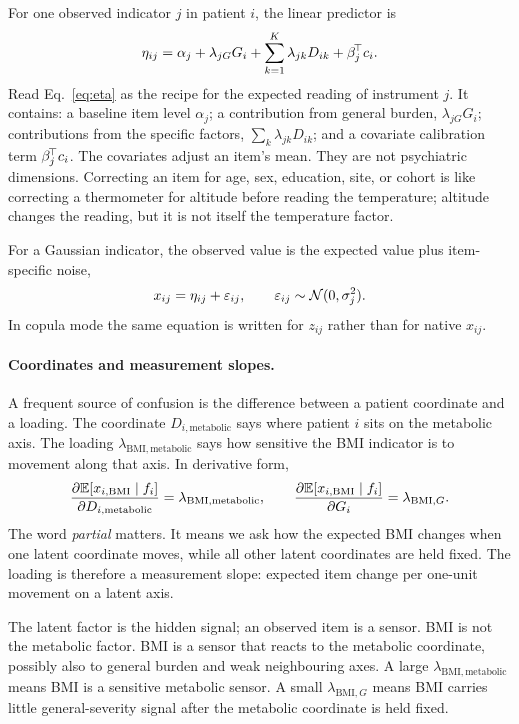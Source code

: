 For one observed indicator $j$ in patient $i$, the linear predictor is
\begin{equation}
\label{eq:eta}
\eta_{ij}=\alpha_j+\lambda_{jG}G_i+\sum_{k=1}^{K}\lambda_{jk}D_{ik}+\beta_j^{\!\top} c_i .
\end{equation}
Read Eq.~\eqref{eq:eta} as the recipe for the expected reading of instrument $j$. It contains: a baseline item
level $\alpha_j$; a contribution from general burden, $\lambda_{jG}G_i$; contributions from the specific factors,
$\sum_k\lambda_{jk}D_{ik}$; and a covariate calibration term $\beta_j^{\!\top} c_i$. The covariates adjust an item's
mean. They are not psychiatric dimensions. Correcting an item for age, sex, education, site, or cohort is like
correcting a thermometer for altitude before reading the temperature; altitude changes the reading, but it is not
itself the temperature factor.

For a Gaussian indicator, the observed value is the expected value plus item-specific noise,
\begin{equation}
\label{eq:item_gaussian}
x_{ij}=\eta_{ij}+\varepsilon_{ij},\qquad \varepsilon_{ij}\sim\mathcal{N}(0,\sigma_j^2).
\end{equation}
In copula mode the same equation is written for $z_{ij}$ rather than for native $x_{ij}$.

\paragraph{Coordinates and measurement slopes.} A frequent source of confusion is the difference between a
patient coordinate and a loading. The coordinate $D_{i,\mathrm{metabolic}}$ says where patient $i$ sits on the
metabolic axis. The loading $\lambda_{\mathrm{BMI},\mathrm{metabolic}}$ says how sensitive the BMI indicator is
to movement along that axis. In derivative form,
\begin{equation}
\frac{\partial\mathbb{E}[x_{i,\mathrm{BMI}}\mid f_i]}{\partial D_{i,\mathrm{metabolic}}}
=\lambda_{\mathrm{BMI},\mathrm{metabolic}},
\qquad
\frac{\partial\mathbb{E}[x_{i,\mathrm{BMI}}\mid f_i]}{\partial G_i}
=\lambda_{\mathrm{BMI},G}.
\end{equation}
The word \emph{partial} matters. It means we ask how the expected BMI changes when one latent coordinate moves,
while all other latent coordinates are held fixed. The loading is therefore a measurement slope: expected item
change per one-unit movement on a latent axis.

\begin{methodsbox}
The latent factor is the hidden signal; an observed item is a sensor. BMI is not the metabolic factor. BMI is a
sensor that reacts to the metabolic coordinate, possibly also to general burden and weak neighbouring axes. A
large $\lambda_{\mathrm{BMI},\mathrm{metabolic}}$ means BMI is a sensitive metabolic sensor. A small
$\lambda_{\mathrm{BMI},G}$ means BMI carries little general-severity signal after the metabolic coordinate is
held fixed.
\end{methodsbox}

